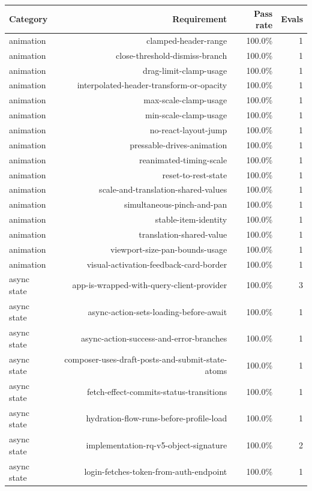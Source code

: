 \begin{table}[htbp]
\centering
\begin{tabular}{lrrr}
\toprule
Category & Requirement & Pass rate & Evals \\
\midrule
animation & clamped-header-range & 100.0\% & 1 \\
animation & close-threshold-dismiss-branch & 100.0\% & 1 \\
animation & drag-limit-clamp-usage & 100.0\% & 1 \\
animation & interpolated-header-transform-or-opacity & 100.0\% & 1 \\
animation & max-scale-clamp-usage & 100.0\% & 1 \\
animation & min-scale-clamp-usage & 100.0\% & 1 \\
animation & no-react-layout-jump & 100.0\% & 1 \\
animation & pressable-drives-animation & 100.0\% & 1 \\
animation & reanimated-timing-scale & 100.0\% & 1 \\
animation & reset-to-rest-state & 100.0\% & 1 \\
animation & scale-and-translation-shared-values & 100.0\% & 1 \\
animation & simultaneous-pinch-and-pan & 100.0\% & 1 \\
animation & stable-item-identity & 100.0\% & 1 \\
animation & translation-shared-value & 100.0\% & 1 \\
animation & viewport-size-pan-bounds-usage & 100.0\% & 1 \\
animation & visual-activation-feedback-card-border & 100.0\% & 1 \\
async state & app-is-wrapped-with-query-client-provider & 100.0\% & 3 \\
async state & async-action-sets-loading-before-await & 100.0\% & 1 \\
async state & async-action-success-and-error-branches & 100.0\% & 1 \\
async state & composer-uses-draft-posts-and-submit-state-atoms & 100.0\% & 1 \\
async state & fetch-effect-commits-status-transitions & 100.0\% & 1 \\
async state & hydration-flow-runs-before-profile-load & 100.0\% & 1 \\
async state & implementation-rq-v5-object-signature & 100.0\% & 2 \\
async state & login-fetches-token-from-auth-endpoint & 100.0\% & 1 \\

\end{tabular}
\end{table}
